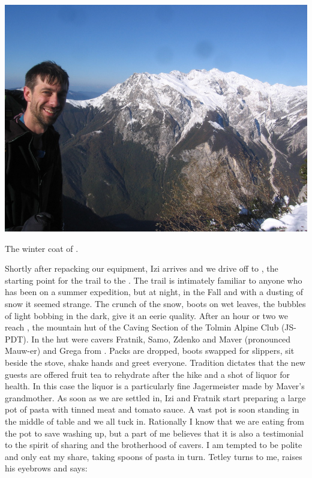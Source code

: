 \begin{pagefigure}
\checkoddpage \ifoddpage \forcerectofloat \else \forceversofloat \fi
   \centering
\includegraphics[width = \textwidth]{2011/super_action/Jarvist M Frost - Canon A520 - M2 Super Action - 2011-10-22-10.00.07-IMG_0185--orig.jpg}
\caption{The winter coat of . } \label{krn october}
\end{pagefigure}

Shortly after repacking our equipment, Izi arrives and we drive off to
, the starting point for the trail to the . The trail is intimately familiar to anyone who has been on a
summer expedition, but at night, in the Fall and with a dusting of snow
it seemed strange. The crunch of the snow, boots on wet leaves, the
bubbles of light bobbing in the dark, give it an eerie quality. After an
hour or two we reach , the mountain hut of the Caving Section of the
Tolmin Alpine Club (JS-PDT). In the hut were  cavers Fratnik,
Samo, Zdenko and Maver (pronounced Mauw-er) and Grega from .
Packs are dropped, boots swapped for slippers, sit beside the stove,
shake hands and greet everyone. Tradition dictates that the new guests
are offered fruit tea to rehydrate after the hike and a shot of liquor
for health. In this case the liquor is a particularly fine Jagermeister
made by Maver's grandmother. As soon as we are settled in, Izi and
Fratnik start preparing a large pot of pasta with tinned meat and tomato
sauce. A vast pot is soon standing in the middle of table and we all
tuck in. Rationally I know that we are eating from the pot to save
washing up, but a part of me believes that it is also a testimonial to
the spirit of sharing and the brotherhood of cavers. I am tempted to be
polite and only eat my share, taking spoons of pasta in turn. Tetley
turns to me, raises his eyebrows and says:

